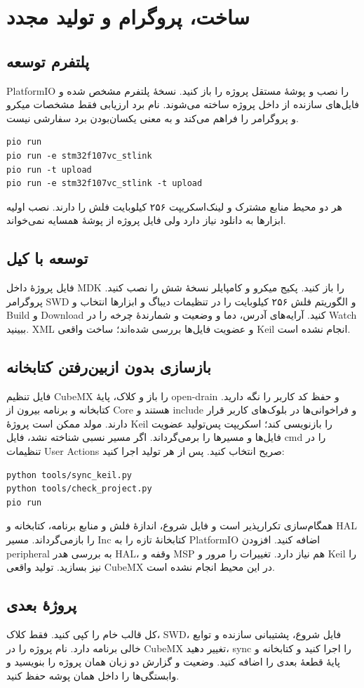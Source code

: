 \section{ساخت، پروگرام و تولید مجدد}
\subsection{پلتفرم توسعه}
PlatformIO را نصب و پوشهٔ مستقل پروژه را باز کنید. نسخهٔ پلتفرم مشخص شده و
فایل‌های سازنده از داخل پروژه ساخته می‌شوند. نام برد ارزیابی فقط مشخصات میکرو
و پروگرامر را فراهم می‌کند و به معنی یکسان‌بودن برد سفارشی نیست.
\begin{LTR}
\begin{lstlisting}[language={}]
pio run
pio run -e stm32f107vc_stlink
pio run -t upload
pio run -e stm32f107vc_stlink -t upload
\end{lstlisting}
\end{LTR}
هر دو محیط منابع مشترک و لینک‌اسکریپت ۲۵۶ کیلوبایت فلش را دارند. نصب اولیه
ابزارها به دانلود نیاز دارد ولی فایل پروژه از پوشهٔ همسایه نمی‌خواند.

\subsection{توسعه با کیل}
فایل پروژهٔ داخل MDK را باز کنید. پکیج میکرو و کامپایلر نسخهٔ شش را نصب کنید.
پروگرامر SWD و الگوریتم فلش ۲۵۶ کیلوبایت را در تنظیمات دیباگ و ابزارها انتخاب
و Build و Download کنید. آرایه‌های آدرس، دما و وضعیت و شمارندهٔ چرخه را در Watch
ببینید. XML و عضویت فایل‌ها بررسی شده‌اند؛ ساخت واقعی Keil انجام نشده است.

\subsection{بازسازی بدون ازبین‌رفتن کتابخانه}
فایل تنظیم CubeMX را باز و کلاک، پایهٔ open-drain و حفظ کد کاربر را نگه دارید.
کتابخانه و برنامه بیرون از Core هستند و include و فراخوانی‌ها در بلوک‌های
کاربر قرار دارند. مولد ممکن است پروژهٔ Keil را بازنویسی کند؛ اسکریپت پس‌تولید
عضویت فایل‌ها و مسیرها را برمی‌گرداند. اگر مسیر نسبی شناخته نشد، فایل cmd را
در تنظیمات User Actions صریح انتخاب کنید. پس از هر تولید اجرا کنید:
\begin{LTR}
\begin{lstlisting}[language={}]
python tools/sync_keil.py
python tools/check_project.py
pio run
\end{lstlisting}
\end{LTR}
همگام‌سازی تکرارپذیر است و فایل شروع، اندازهٔ فلش و منابع برنامه، کتابخانه و
HAL را بازمی‌گرداند. مسیر Inc کتابخانهٔ تازه را به PlatformIO اضافه کنید.
افزودن peripheral به بررسی هدر HAL، وقفه و MSP هم نیاز دارد. تغییرات را مرور
و Keil را نیز بسازید. تولید واقعی CubeMX در این محیط انجام نشده است.

\subsection{پروژهٔ بعدی}
کل قالب خام را کپی کنید. فقط کلاک، SWD، فایل شروع، پشتیبانی سازنده و توابع خالی
برنامه دارد. نام پروژه را در CubeMX تغییر دهید، sync را اجرا کنید و کتابخانه
و پایهٔ قطعهٔ بعدی را اضافه کنید. وضعیت و گزارش دو زبان همان پروژه را بنویسید
و وابستگی‌ها را داخل همان پوشه حفظ کنید.
